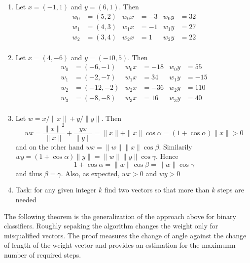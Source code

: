 \begin{examples}
    \hfill
    \begin{enumerate}
        \item Let \( x = (-1, 1) \) and \( y = (6, 1) \). Then
              \[
                  \begin{aligned}
                      w_0 & = (5, 2) & w_0x & = -3 & w_0y & = 32 \\
                      w_1 & = (4, 3) & w_1x & = -1 & w_1y & = 27 \\
                      w_2 & = (3, 4) & w_2x & = 1  & w_2y & = 22 \\
                  \end{aligned}
              \]
        \item Let \( x = (4, -6) \) and \( y = (-10, 5) \). Then
              \[
                  \begin{aligned}
                      w_0 & = (-6, -1)  & w_0x & = -18 & w_0y & = 55  \\
                      w_1 & = (-2, -7)  & w_1x & = 34  & w_1y & = -15 \\
                      w_2 & = (-12, -2) & w_2x & = -36 & w_2y & = 110 \\
                      w_3 & = (-8, -8)  & w_3x & = 16  & w_3y & = 40  \\
                  \end{aligned}
              \]
        \item
              Let \( w = x / \|x\| + y/ \|y\| \). Then
              \[
                  wx = \frac{{\|x\|}^2}{\|x\|} + \frac{yx}{\|y\|} = \|x\| + \|x\|\cos\alpha = (1 + \cos\alpha)\|x\| > 0
              \]
              and on the other hand \( wx = \|w\| \|x\| \cos\beta \). Similarily
              \( wy = (1 + \cos\alpha)\|y\| = \|w\| \|y\| \cos\gamma \). Hence
              \[
                  1 + \cos\alpha = \|w\|\cos\beta = \|w\|\cos\gamma
              \]
              and thus \( \beta = \gamma \). Also, as expected, \( wx > 0 \) and \( wy > 0 \)
        \item Task: for any given integer \( k \) find two vectors so that more than \( k \) steps are needed
    \end{enumerate}
\end{examples}
\bigskip


The following theorem is the generalization of the approach above for binary classifiers. 
Roughly sepaking the algorithm changes the weight only for misqualified vectors. The proof measures 
the change of angle against the change of length of the weight vector and provides an estimation 
for the maximumn number of required steps.
\bigskip

